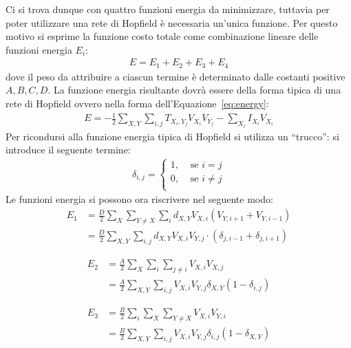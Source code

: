 Ci si trova dunque con quattro funzioni energia da minimizzare, tuttavia per poter utilizzare una rete di Hopfield è necessaria un'unica funzione. Per questo motivo si esprime la funzione costo totale come combinazione lineare delle funzioni energia $E_i$:
\begin{align}
    E = E_1 + E_2 + E_3 + E_4
\end{align}
dove il peso da attribuire a ciascun termine è determinato dalle costanti positive $A, B, C, D$. La funzione energia risultante dovrà essere della forma tipica di una rete di Hopfield ovvero nella forma dell'Equazione~\eqref{eq:energy}:
\begin{align*}
     E = - \frac{1}{2} \sum_{X, Y} \sum_{i, j} T_{X_i, Y_j} V_{X_i} V_{Y_j} - \sum_{X_i} I_{X_i} V_{X_i}
\end{align*}
Per ricondursi alla funzione energia tipica di Hopfield si utilizza un “trucco”: si introduce il seguente termine:
\begin{align*}
	\delta_{i,j} =
	\begin{cases}
		1, &\text{ se } i = j\\
		0, &\text{ se } i \neq j \\
	\end{cases}
\end{align*}
Le funzioni energia si possono ora riscrivere nel seguente modo:
\begin{align*}
	E_1 &= \frac{D}{2} \sum_X \sum_{Y \neq X} \sum_i d_{X,Y} V_{X,i} (V_{Y, i+1} + V_{Y, i-1}) \\
	&=  \frac{D}{2} \sum_{X,Y} \sum_{i,j} d_{X,Y} V_{X,i} V_{Y,j} \cdot (\delta_{j, i-1} + \delta_{j, i+1})
\end{align*}

\begin{align*}
    E_2 &= \frac{A}{2} \sum_X \sum_i \sum_{j \neq i} V_{X,i} V_{X,j} \\
	&= \frac{A}{2} \sum_{X,Y} \sum_{i,j} V_{X,i} V_{Y,j} \delta_{X,Y} (1 - \delta_{i,j})
\end{align*}

\begin{align*}
    E_3 &= \frac{B}{2} \sum_i \sum_X \sum_{Y \neq X} V_{X,i} V_{Y,i} \\
	&= \frac{B}{2} \sum_{X,Y} \sum_{i,j} V_{X,i} V_{Y,j} \delta_{i,j} (1 - \delta_{X,Y})
\end{align*}

